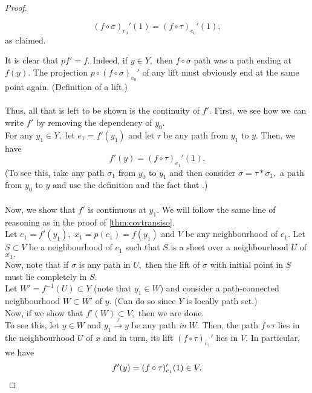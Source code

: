 \documentclass[12pt]{article}
\theoremstyle{definition}
\numberwithin{thm}{section}
\newenvironment{blockquote}
{\begin{mdframed}[skipabove=0pt, skipbelow=0pt, innertopmargin=4pt, innerbottommargin=4pt, bottomline=false,topline=false,rightline=false, linewidth=2pt]}
{\end{mdframed}}
\begin{document}
\begin{proof}
\begin{blockquote}
\begin{equation*}
			(f\circ\sigma)_{e_0}'(1) = (f\circ\tau)_{e_0}'(1),
		\end{equation*}
		as claimed.
	\end{blockquote}
	It is clear that $pf' = f.$ Indeed, if $y \in Y,$ then $f\circ\sigma$ path was a path ending at $f(y).$ The projection $p\circ(f\circ\sigma)_{e_0}'$ of any lift must obviously end at the same point again. (Definition of a lift.)\\~\\
	Thus, all that is left to be shown is the continuity of $f'.$ First, we see how we can write $f'$ by removing the dependency of $y_0.$\\
	For any $y_1 \in Y,$ let $e_1 = f'(y_1)$ and let $\tau$ be any path from $y_1$ to $y.$ Then, we have
	\begin{equation*} 
		f'(y) = (f\circ\tau)_{e_1}'(1).
	\end{equation*}
	(To see this, take any path $\sigma_1$ from $y_0$ to $y_1$ and then consider $\sigma = \tau*\sigma_1,$ a path from $y_0$ to $y$ and use the definition and the fact that .)\\~\\
	Now, we show that $f'$ is continuous at $y_1.$ We will follow the same line of reasoning as in the proof of \ref{thm:covtransiso}.\\
	Let $e_1 = f'(y_1),$ $x_1 = p(e_1) = f(y_1)$ and $V$ be any neighbourhood of $e_1.$ Let $S \subset V$ be a neighbourhood of $e_1$ such that $S$ is a sheet over a neighbourhood $U$ of $x_1.$ \\
	Now, note that if $\sigma$ is any path in $U,$ then the lift of $\sigma$ with initial point in $S$ must lie completely in $S.$\\
	Let $W' = f^{-1}(U) \subset Y$ (note that $y_1 \in W$) and consider a path-connected neighbourhood $W \subset W'$ of $y.$ (Can do so since $Y$ is locally path set.)\\
	Now, if we show that $f'(W) \subset V,$ then we are done.\\
	To see this, let $y \in W$ and $y_1 \overset{\tau}{\longrightarrow} y$ be any path \emph{in} $W.$ Then, the path $f\circ\tau$ lies in the neighbourhood $U$ of $x$ and in turn, its lift $(f\circ\tau)_{e_1}'$ lies in $V.$ In particular, we have
	\begin{equation*} 
		f'(y) = (f\circ\tau)_{e_1}'(1) \in V. \qedhere
	\end{equation*}
	
\end{proof}
\end{document}
